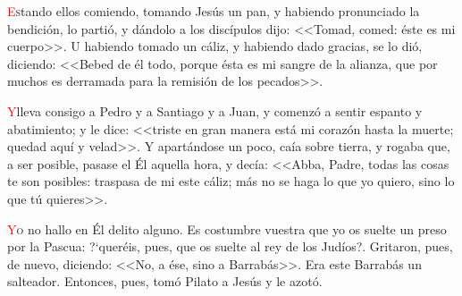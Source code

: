 \documentclass[10pt,twoside]{book}
\begin{document}


\vspace{1.5em}

\noindent{}
\lettrine[lines=2]{\textcolor{red}{E}}stando ellos comiendo, tomando Jesús un pan, y habiendo pronunciado la bendición, lo partió, y dándolo a los discípulos dijo: <<Tomad, comed: éste es mi cuerpo>>.
U habiendo tomado un cáliz, y habiendo dado gracias, se lo dió, diciendo: <<Bebed de él todo, porque ésta es mi sangre de la alianza, que por muchos es derramada para la remisión de los pecados>>.

\vspace{0.5em}

{} 

\vspace{0.5em}

\iralfinal

\vspace{1.5em}

\noindent{}

\vspace{1.5em}

\noindent{}
\lettrine[lines=2]{\textcolor{red}{Y}}\space lleva consigo a Pedro y a Santiago y a Juan, y comenzó a sentir espanto y abatimiento; y le dice: <<triste en gran manera está mi corazón hasta la muerte;
quedad aquí y velad>>. Y apartándose un poco, caía sobre tierra, y rogaba que, a ser posible, pasase el Él aquella hora, y decía: <<Abba, Padre, todas las cosas te son posibles:
traspasa de mi este cáliz; más no se haga lo que yo quiero, sino lo que tú quieres>>.

\vspace{0.5em}



\vspace{1.5em}

\noindent{}
\lettrine[lines=2, ante=\guillemotleft]{\textcolor{red}{Y}}o no hallo en Él delito alguno. Es costumbre vuestra que yo os suelte un preso por la Pascua: {?`}queréis, 
pues, que os suelte al rey de los Judíos?\guillemotright. Gritaron, pues, de nuevo, diciendo: <<No, a ése, sino a Barrabás>>. 
Era este Barrabás un salteador. Entonces, pues, tomó Pilato a Jesús y le azotó.
\end{document}
